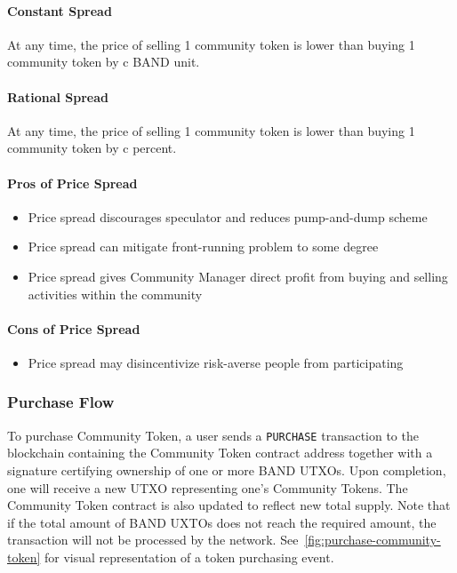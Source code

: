 \documentclass[letterpaper,11pt]{article}
\begin{document}
\paragraph{Constant Spread} At any time, the price of selling 1 community token is lower than buying 1 community token by c BAND unit.
\paragraph{Rational Spread} At any time, the price of selling 1 community token is lower than buying 1 community token by c percent.

\paragraph{Pros of Price Spread}
\begin{itemize}
\setlength\itemsep{0em}
\item Price spread discourages speculator and reduces pump-and-dump scheme
\item Price spread can mitigate front-running problem to some degree
\item Price spread gives Community Manager direct profit from buying and selling activities within the community
\end{itemize}

\paragraph{Cons of Price Spread}
\begin{itemize}
\setlength\itemsep{0em}
\item Price spread may disincentivize risk-averse people from participating
\end{itemize}

\subsubsection{Purchase Flow}
To purchase Community Token, a user sends a {\tt PURCHASE} transaction to the blockchain containing the Community Token contract address together with a signature certifying ownership of one or more BAND UTXOs. Upon completion, one will receive a new UTXO representing one's Community Tokens. The Community Token contract is also updated to reflect new total supply. Note that if the total amount of BAND UXTOs does not reach the required amount, the transaction will not be processed by the network. See~\cref{fig:purchase-community-token} for visual representation of a token purchasing event.
\end{document}
